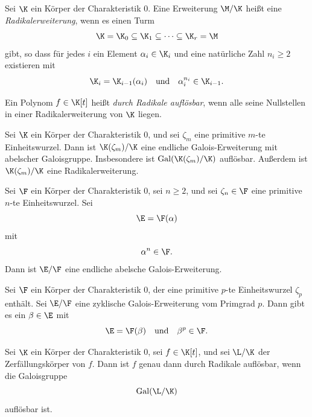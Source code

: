 \documentclass[11pt, a4paper]{article}
\begin{document}
\begin{definition}
\Theorem
Sei $\K$ ein Körper der Charakteristik $0$. Eine Erweiterung $\M/\K$ heißt eine \emph{Radikalerweiterung}, wenn es einen Turm
$$
\K = \K_0 \subseteq \K_1 \subseteq \dots \subseteq \K_r = \M
$$
gibt, so dass für jedes $i$ ein Element $\alpha_i \in \K_i$ und eine natürliche Zahl $n_i \geq 2$ existieren mit
$$
\K_i = \K_{i-1}(\alpha_i) \quad \text{und} \quad \alpha_i^{n_i} \in \K_{i-1}.
$$

Ein Polynom $f \in \K[t]$ heißt \emph{durch Radikale auflösbar}, wenn alle seine Nullstellen in einer Radikalerweiterung von $\K$ liegen.
\end{definition}



\begin{lemma}[Einheitswurzelerweiterungen]
Sei $\K$ ein Körper der Charakteristik $0$, und sei $\zeta_m$ eine primitive $m$-te Einheitswurzel. Dann ist $\K(\zeta_m)/\K$ eine endliche Galois-Erweiterung mit abelscher Galoisgruppe. Insbesondere ist $\mathrm{Gal}(\K(\zeta_m)/\K)$ auflösbar. Außerdem ist $\K(\zeta_m)/\K$ eine Radikalerweiterung.
\end{lemma}


\begin{lemma}
Sei $\F$ ein Körper der Charakteristik $0$, sei $n \geq 2$, und sei $\zeta_n \in \F$ eine primitive $n$-te Einheitswurzel. Sei
$$
\E = \F(\alpha)
$$
mit
$$
\alpha^n \in \F.
$$
Dann ist $\E/\F$ eine endliche abelsche Galois-Erweiterung.
\end{lemma}

\begin{lemma}
Sei $\F$ ein Körper der Charakteristik $0$, der eine primitive $p$-te Einheitswurzel $\zeta_p$ enthält. Sei $\E/\F$ eine zyklische Galois-Erweiterung vom Primgrad $p$. Dann gibt es ein $\beta \in \E$ mit
$$
\E = \F(\beta) \quad \text{und} \quad \beta^p \in \F.
$$
\end{lemma}

\begin{mdbox}
\begin{theorem}
\Theorem
Sei $\K$ ein Körper der Charakteristik $0$, sei $f \in \K[t]$, und sei $\L/\K$ der Zerfällungskörper von $f$. Dann ist $f$ genau dann durch Radikale auflösbar, wenn die Galoisgruppe
$$
\mathrm{Gal}(\L/\K)
$$
auflösbar ist.
\end{theorem}
\end{mdbox}
\end{document}

